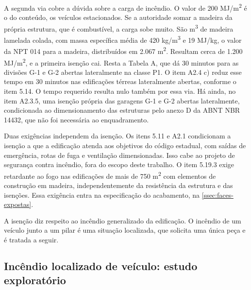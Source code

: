 A segunda via cobre a dúvida sobre a carga de incêndio. O valor de 200
MJ/m\textsuperscript{2} é o do conteúdo, os veículos estacionados. Se a
autoridade somar a madeira da própria estrutura, que é combustível, a carga sobe
muito. São \custoVolMLC{} m\textsuperscript{3} de madeira lamelada colada, com massa
específica média de 420 kg/m\textsuperscript{3} e 19 MJ/kg, o valor da NPT 014
para a madeira, distribuídos em 2.067 m\textsuperscript{2}. Resultam cerca de
1.200 MJ/m\textsuperscript{2}, e a primeira isenção cai. Resta a Tabela A, que dá
30 minutos para as divisões G-1 e G-2 abertas lateralmente na classe P1. O item
A2.4 c) reduz esse tempo em 30 minutos nas edificações térreas lateralmente
abertas, conforme o item 5.14. O tempo requerido resulta nulo também por essa
via. Há ainda, no item A2.3.5, uma isenção própria das garagens G-1 e G-2
abertas lateralmente, condicionada ao dimensionamento das estruturas pelo anexo D
da ABNT NBR 14432, que não foi necessária ao enquadramento.

Duas exigências independem da isenção. Os itens 5.11 e A2.1 condicionam a
isenção a que a edificação atenda aos objetivos do código estadual, com saídas de
emergência, rotas de fuga e ventilação dimensionadas. Isso cabe ao projeto de
segurança contra incêndio, fora do escopo deste trabalho. O item 5.19.3 exige
retardante ao fogo nas edificações de mais de 750 m\textsuperscript{2} com
elementos de construção em madeira, independentemente da resistência da
estrutura e das isenções. Essa exigência entra na especificação do acabamento, na
\autoref{ssec:faces-expostas}.


A isenção diz respeito ao incêndio generalizado da edificação. O incêndio de um
veículo junto a um pilar é uma situação localizada, que solicita uma única peça e
é tratada a seguir.

\subsection{Incêndio localizado de veículo: estudo exploratório}\label{ssec:incendio-veiculo}

